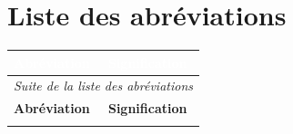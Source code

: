 \chapter*{Liste des abréviations}

\vspace{0.5cm}

\begin{longtable}{lp{}}
  \toprule
  \rowcolor{tablehead}
  \textcolor{white}{\textbf{Abréviation}} &
  \textcolor{white}{\textbf{Signification}} \\
  \midrule
  \endfirsthead
  \multicolumn{2}{c}{\textit{Suite de la liste des abréviations}} \\
  \toprule
  \textbf{Abréviation} & \textbf{Signification} \\
  \midrule
  \endhead
  \bottomrule
  \endfoot


\end{longtable}
